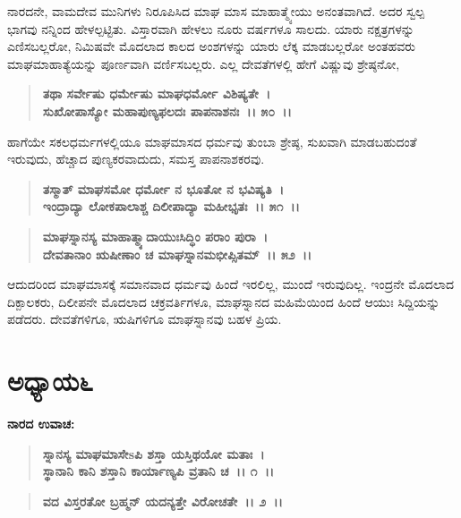 ನಾರದನೇ, ವಾಮದೇವ ಮುನಿಗಳು ನಿರೂಪಿಸಿದ ಮಾಘ ಮಾಸ ಮಾಹಾತ್ಮ್ಯೇಯು ಅನಂತವಾಗಿದೆ. ಅದರ ಸ್ವಲ್ಪ ಭಾಗವು ನನ್ನಿಂದ ಹೇಳಲ್ಪಟ್ಟಿತು. ವಿಸ್ತಾರವಾಗಿ ಹೇಳಲು ನೂರು ವರ್ಷಗಳೂ ಸಾಲದು. ಯಾರು ನಕ್ಷತ್ರಗಳನ್ನು ಎಣಿಸಬಲ್ಲರೋ, ನಿಮಿಷವೇ ಮೊದಲಾದ ಕಾಲದ ಅಂಶಗಳನ್ನು ಯಾರು ಲೆಕ್ಕ ಮಾಡಬಲ್ಲರೋ ಅಂತಹವರು ಮಾಘಮಾಹಾತ್ಯೆಯನ್ನು ಪೂರ್ಣವಾಗಿ ವರ್ಣಿಸಬಲ್ಲರು. ಎಲ್ಲ ದೇವತೆಗಳಲ್ಲಿ ಹೇಗೆ ವಿಷ್ಣುವು ಶ್ರೇಷ್ಠನೋ,

\begin{verse}
\textbf{ತಥಾ ಸರ್ವೇಷು ಧರ್ಮೇಷು ಮಾಘಧರ್ಮೋ ವಿಶಿಷ್ಯತೇ~।}\\\textbf{ಸುಖೋಪಾಸ್ಯೋ ಮಹಾಪುಣ್ಯಫಲದಃ ಪಾಪನಾಶನಃ~।। ೫೦~।।}
\end{verse}

ಹಾಗೆಯೇ ಸಕಲಧರ್ಮಗಳಲ್ಲಿಯೂ ಮಾಘಮಾಸದ ಧರ್ಮವು ತುಂಬಾ ಶ್ರೇಷ್ಠ, ಸುಖವಾಗಿ ಮಾಡಬಹುದಂತೆ ಇರುವುದು, ಹೆಚ್ಚಾದ ಪುಣ್ಯಕರವಾದುದು, ಸಮಸ್ತ ಪಾಪನಾಶಕರವು.

\begin{verse}
\textbf{ತಸ್ಮಾತ್ ಮಾಘಸಮೋ ಧರ್ಮೋ ನ ಭೂತೋ ನ ಭವಿಷ್ಯತಿ~।}\\\textbf{ಇಂದ್ರಾದ್ಯಾ ಲೋಕಪಾಲಾಶ್ಚ ದಿಲೀಪಾದ್ಯಾ ಮಹೀಭೃತಃ~।। ೫೧~।।} 
\end{verse}

\begin{verse}
\textbf{ಮಾಘಸ್ನಾನಸ್ಯ ಮಾಹಾತ್ಮ್ಯಾದಾಯುಃಸಿದ್ಧಿಂ ಪರಾಂ ಪುರಾ~।}\\\textbf{ದೇವತಾನಾಂ ಋಷೀಣಾಂ ಚ ಮಾಘಸ್ನಾನಮಭೀಪ್ಸಿತಮ್~।। ೫೨~।।}
\end{verse}

ಆದುದರಿಂದ ಮಾಘಮಾಸಕ್ಕೆ ಸಮಾನವಾದ ಧರ್ಮವು ಹಿಂದೆ ಇರಲಿಲ್ಲ, ಮುಂದೆ ಇರುವುದಿಲ್ಲ. ಇಂದ್ರನೇ ಮೊದಲಾದ ದಿಕ್ಪಾಲಕರು, ದಿಲೀಪನೇ ಮೊದಲಾದ ಚಕ್ರವರ್ತಿಗಳೂ, ಮಾಘಸ್ನಾನದ ಮಹಿಮೆಯಿಂದ ಹಿಂದೆ ಆಯುಃ ಸಿದ್ದಿಯನ್ನು ಪಡೆದರು. ದೇವತೆಗಳಿಗೂ, ಋಷಿಗಳಿಗೂ ಮಾಘಸ್ನಾನವು ಬಹಳ ಪ್ರಿಯ.

\newpage

\section*{ಅಧ್ಯಾಯ\enginline{-}೬}

\emptypage

\begin{flushleft}
\textbf{ನಾರದ ಉವಾಚ:\enginline{-}}
\end{flushleft}

\begin{verse}
\textbf{ಸ್ನಾನಸ್ಯ ಮಾಘಮಾಸೇsಪಿ ಶಸ್ತಾ ಯಸ್ತಿಥಯೋ ಮತಾಃ~।}\\\textbf{ಸ್ಥಾನಾನಿ ಕಾನಿ ಶಸ್ತಾನಿ ಕಾರ್ಯಾಣ್ಯಪಿ ವ್ರತಾನಿ ಚ~।। ೧~।।}
\end{verse}

\begin{verse}
\textbf{ವದ ವಿಸ್ತರತೋ ಬ್ರಹ್ಮನ್ ಯದನ್ಯತ್ತೇ ವಿರೋಚತೇ~।। ೨~।।}
\end{verse}

